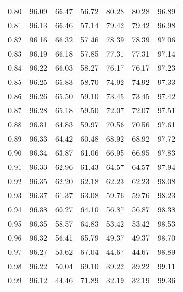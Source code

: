 \begin{tabular}{|c|c|c|c|c|c|c|}
      0.80 &     96.09 &     66.47 &      56.72 &   80.28 &      80.28 &         96.89 \\
      0.81 &     96.13 &     66.46 &      57.14 &   79.42 &      79.42 &         96.98 \\
      0.82 &     96.16 &     66.32 &      57.46 &   78.39 &      78.39 &         97.06 \\
      0.83 &     96.19 &     66.18 &      57.85 &   77.31 &      77.31 &         97.14 \\
      0.84 &     96.22 &     66.03 &      58.27 &   76.17 &      76.17 &         97.23 \\
      0.85 &     96.25 &     65.83 &      58.70 &   74.92 &      74.92 &         97.33 \\
      0.86 &     96.26 &     65.50 &      59.10 &   73.45 &      73.45 &         97.42 \\
      0.87 &     96.28 &     65.18 &      59.50 &   72.07 &      72.07 &         97.51 \\
      0.88 &     96.31 &     64.83 &      59.97 &   70.56 &      70.56 &         97.61 \\
      0.89 &     96.33 &     64.42 &      60.48 &   68.92 &      68.92 &         97.72 \\
      0.90 &     96.34 &     63.87 &      61.06 &   66.95 &      66.95 &         97.83 \\
      0.91 &     96.33 &     62.96 &      61.43 &   64.57 &      64.57 &         97.94 \\
      0.92 &     96.35 &     62.20 &      62.18 &   62.23 &      62.23 &         98.08 \\
      0.93 &     96.37 &     61.37 &      63.08 &   59.76 &      59.76 &         98.23 \\
      0.94 &     96.38 &     60.27 &      64.10 &   56.87 &      56.87 &         98.38 \\
      0.95 &     96.35 &     58.57 &      64.83 &   53.42 &      53.42 &         98.53 \\
      0.96 &     96.32 &     56.41 &      65.79 &   49.37 &      49.37 &         98.70 \\
      0.97 &     96.27 &     53.62 &      67.04 &   44.67 &      44.67 &         98.89 \\
      0.98 &     96.22 &     50.04 &      69.10 &   39.22 &      39.22 &         99.11 \\
      0.99 &     96.12 &     44.46 &      71.89 &   32.19 &      32.19 &         99.36 \\
\bottomrule
\end{tabular}
